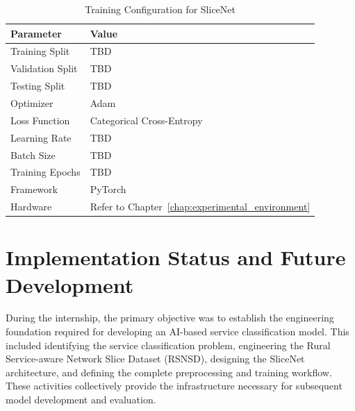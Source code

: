 \documentclass[12pt,a4paper]{report}
\begin{document}
	\begin{table}[H]
		\centering
		\caption{Training Configuration for SliceNet}
		\label{tab:training}
		
		\begin{tabular}{|p{5cm}|p{6cm}|}
			\hline
			
			\textbf{Parameter} &
			\textbf{Value}
			\\
			\hline
			
			Training Split &
			TBD
			\\
			\hline
			
			Validation Split &
			TBD
			\\
			\hline
			
			Testing Split &
			TBD
			\\
			\hline
			
			Optimizer &
			Adam
			\\
			\hline
			
			Loss Function &
			Categorical Cross-Entropy
			\\
			\hline
			
			Learning Rate &
			TBD
			\\
			\hline
			
			Batch Size &
			TBD
			\\
			\hline
			
			Training Epochs &
			TBD
			\\
			\hline
			
			Framework &
			PyTorch
			\\
			\hline
			
			Hardware &
			Refer to Chapter~\ref{chap:experimental_environment}
			\\
			\hline
			
		\end{tabular}
		
	\end{table}

	
	
\section{Implementation Status and Future Development}
\label{sec:implementation_status}

During the internship, the primary objective was to establish the engineering foundation required for developing an AI-based service classification model. This included identifying the service classification problem, engineering the Rural Service-aware Network Slice Dataset (RSNSD), designing the SliceNet architecture, and defining the complete preprocessing and training workflow. These activities collectively provide the infrastructure necessary for subsequent model development and evaluation.
\end{document}
